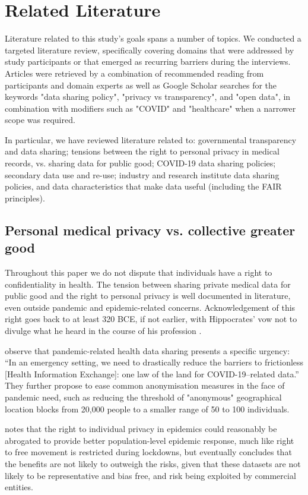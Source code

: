\documentclass{CUP-JNL-DAP}%
\begin{document}
\section{Related Literature}

Literature related to this study's goals spans a number of topics. We conducted a targeted literature review, specifically covering domains that were addressed by study participants or that emerged as recurring barriers during the interviews. Articles were retrieved by a combination of recommended reading from participants and domain experts as well as Google Scholar searches for the keywords "data sharing policy", "privacy vs transparency", and "open data", in combination with modifiers such as "COVID" and "healthcare" when a narrower scope was required.

In particular, we have reviewed literature related to: governmental transparency and data sharing; tensions between the right to personal privacy in medical records, vs. sharing data for public good; COVID-19 data sharing policies; secondary data use and re-use; industry and research institute data sharing policies, and data characteristics that make data useful (including the FAIR principles). 

\subsection{Personal medical privacy vs. collective greater good} 
Throughout this paper we do not dispute that individuals have a right to confidentiality in health. The tension between sharing private medical data for public good and the right to personal privacy is well documented in literature, even outside pandemic and epidemic-related concerns.  Acknowledgement of this right goes back to at least 320 BCE, if not earlier, with Hippocrates' vow not to divulge what he heard in the course of his profession \cite{jones_hippocrates}.  

\cite{Leslie_McSwain} observe that pandemic-related health data sharing presents a specific urgency: \enquote{In an emergency setting, we need to drastically reduce the barriers to frictionless [Health Information Exchange]: one law of the land for COVID-19–related data.} They further propose to ease common anonymisation measures in the face of pandemic need, such as reducing the threshold of "anonymous" geographical location blocks from 20,000 people to a smaller range of 50 to 100 individuals. 

\cite{henderson_patient_2021} notes that the right to individual privacy in epidemics could reasonably be abrogated to provide better population-level epidemic response, much like right to free movement is restricted during lockdowns, but eventually concludes that the benefits are not likely to outweigh the risks, given that these datasets are not likely to be representative and bias free, and risk being exploited by commercial entities.
\end{document}
